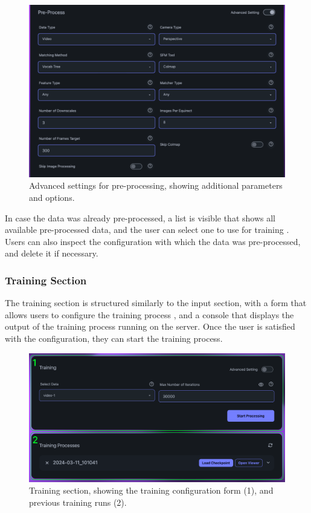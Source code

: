 \begin{figure}[h!]
  \centering
  \includegraphics[width=.65\textwidth]{figures/view-extended-options.png}
  \caption{Advanced settings for pre-processing, showing additional parameters and options.}
  \label{fig:design:advanced-settings}
\end{figure}

In case the data was already pre-processed, a list is visible that shows all available pre-processed data, and the user can select one to use for training .
Users can also inspect the configuration with which the data was pre-processed, and delete it if necessary.

\subsubsection*{Training Section}

The training section is structured similarly to the input section, with a form that allows users to configure the training process , and a console that displays the output of the training process running on the server.
Once the user is satisfied with the configuration, they can start the training process.

\begin{figure}[h!]
  \centering
  \includegraphics[width=.65\textwidth]{figures/view-train.png}
  \caption{Training section, showing the training configuration form (1), and previous training runs (2).}
  \label{fig:design:training-section}
\end{figure}

